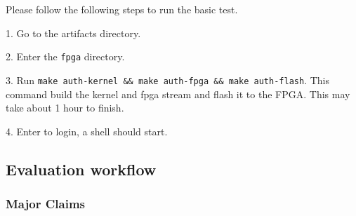 Please follow the following steps to run the basic test.

1. Go to the artifacts directory.

2. Enter the \texttt{fpga} directory.

3. Run \texttt{make auth-kernel \&\& make auth-fpga \&\& make auth-flash}. This command build the kernel and fpga stream and flash it to the FPGA. This may take about 1 hour to finish.

4. Enter  to login, a shell should start.

\subsection{Evaluation workflow}

\subsubsection{Major Claims}

